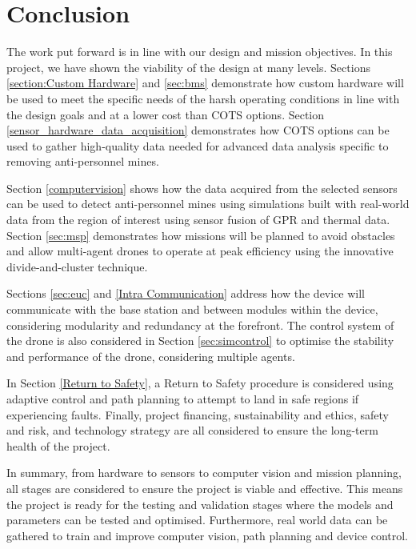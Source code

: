 \newpage
{}

\section{Conclusion} \label{conclusion}

The work put forward is in line with our design and mission objectives. In this project, we have shown the viability of the design at many levels. Sections \ref{section:Custom Hardware} and \ref{sec:bms} demonstrate how custom hardware will be used to meet the specific needs of the harsh operating conditions in line with the design goals and at a lower cost than \gls{COTS} options. Section \ref{sensor_hardware_data_acquisition} demonstrates how \gls{COTS} options can be used to gather high-quality data needed for advanced data analysis specific to removing anti-personnel mines.

Section \ref{computervision} shows how the data acquired from the selected sensors can be used to detect anti-personnel mines using simulations built with real-world data from the region of interest using sensor fusion of \gls{GPR} and thermal data. Section \ref{sec:msp} demonstrates how missions will be planned to avoid obstacles and allow multi-agent drones to operate at peak efficiency using the innovative divide-and-cluster technique. 

Sections \ref{sec:euc} and \ref{Intra Communication} address how the device will communicate with the base station and between modules within the device, considering modularity and redundancy at the forefront. The control system of the drone is also considered in Section \ref{sec:simcontrol} to optimise the stability and performance of the drone, considering multiple agents. 

In Section \ref{Return to Safety}, a Return to Safety procedure is considered using adaptive control and path planning to attempt to land in safe regions if experiencing faults. Finally, project financing, sustainability and ethics, safety and risk, and technology strategy are all considered to ensure the long-term health of the project. 

In summary, from hardware to sensors to computer vision and mission planning, all stages are considered to ensure the project is viable and effective. This means the project is ready for the testing and validation stages where the models and parameters can be tested and optimised. Furthermore, real world data can be gathered to train and improve computer vision, path planning and device control.